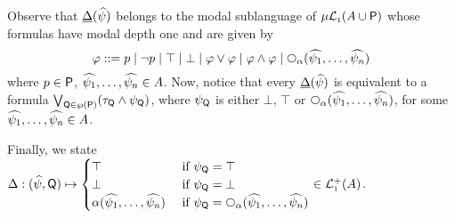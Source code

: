 	Observe that $\underline{\Delta}(\widehat{\psi})$ belongs to the modal sublanguage of $\mu\mathcal{L}_{\scriptscriptstyle 1}(A \cup  \mathsf{P})$ whose formulas have modal depth one and are given by
	\[
\varphi ::= 
   p \mid \neg p \mid \top \mid \bot 
   \mid \varphi\lor\varphi \mid \varphi\land\varphi 
   \mid \nxt{\al}(\fsub{\psi_{1}},\ldots,\fsub{\psi_{n}})
\]
where $p \in\mathsf{P}$, $\widehat{\psi_{1}},\ldots,\widehat{\psi_{n}} \in A$. Now, notice that every $\underline{\Delta}(\widehat{\psi})$ is equivalent to a formula $\bigvee_{{\sf Q}\in \wp{(\mathsf{P})}} (\tau_{{\sf Q}} \land \psi_{{\sf Q}})$, where $\psi_{{\sf Q}}$ is either $\bot$, $\top$ or $\nxt{\al}(\fsub{\psi_{1}},\ldots,\fsub{\psi_{n}})$, for some $\widehat{\psi_{1}},\ldots,\widehat{\psi_{n}} \in A$.

Finally, we state $\tmap: (\fsub{\psi}, {\sf Q}) \mapsto 
\begin{cases}
\top & \text{ if $\psi_{{\sf Q}}= \top$} \\
\bot & \text{ if $\psi_{{\sf Q}}= \bot$} \\
\al(\fsub{\psi_{1}},\ldots,\fsub{\psi_{n}}) & \text{ if $\psi_{{\sf Q}}=\nxt{\al}(\fsub{\psi_{1}},\ldots,\fsub{\psi_{n}})$} \\
\end{cases}
\in \llang^+(A)$.


